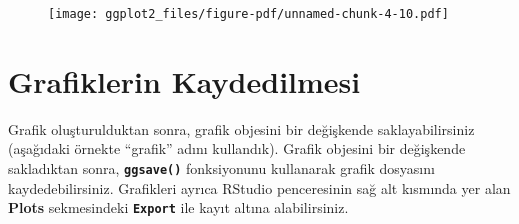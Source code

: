\documentclass[
  letterpaper,
  DIV=11,
  numbers=noendperiod]{scrreprt}
\begin{document}
\begin{figure}[H]

{\centering \texttt{[image: ggplot2\_files/figure-pdf/unnamed-chunk-4-10.pdf]}

}

\end{figure}

\hypertarget{grafiklerin-kaydedilmesi}{%
\section*{Grafiklerin Kaydedilmesi}\label{grafiklerin-kaydedilmesi}}


Grafik oluşturulduktan sonra, grafik objesini bir değişkende
saklayabilirsiniz (aşağıdaki örnekte ``grafik'' adını kullandık). Grafik
objesini bir değişkende sakladıktan sonra, \textbf{\texttt{ggsave()}}
fonksiyonunu kullanarak grafik dosyasını kaydedebilirsiniz. Grafikleri
ayrıca RStudio penceresinin sağ alt kısmında yer alan \textbf{Plots}
sekmesindeki \textbf{\texttt{Export}} ile kayıt altına alabilirsiniz.
\end{document}

